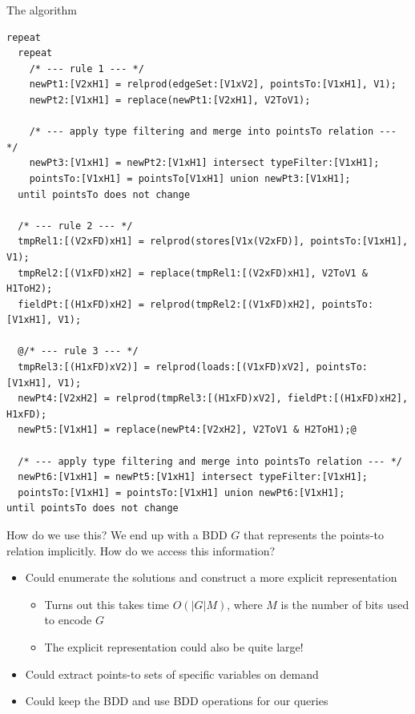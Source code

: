 \documentclass{beamer}
\begin{document}
\begin{frame}[fragile]{The algorithm}
\begin{lstlisting}[style=base]
repeat
  repeat
    /* --- rule 1 --- */
    newPt1:[V2xH1] = relprod(edgeSet:[V1xV2], pointsTo:[V1xH1], V1);
    newPt2:[V1xH1] = replace(newPt1:[V2xH1], V2ToV1);

    /* --- apply type filtering and merge into pointsTo relation --- */
    newPt3:[V1xH1] = newPt2:[V1xH1] intersect typeFilter:[V1xH1];
    pointsTo:[V1xH1] = pointsTo[V1xH1] union newPt3:[V1xH1];
  until pointsTo does not change

  /* --- rule 2 --- */
  tmpRel1:[(V2xFD)xH1] = relprod(stores[V1x(V2xFD)], pointsTo:[V1xH1], V1);
  tmpRel2:[(V1xFD)xH2] = replace(tmpRel1:[(V2xFD)xH1], V2ToV1 & H1ToH2);
  fieldPt:[(H1xFD)xH2] = relprod(tmpRel2:[(V1xFD)xH2], pointsTo:[V1xH1], V1);

  @/* --- rule 3 --- */
  tmpRel3:[(H1xFD)xV2)] = relprod(loads:[(V1xFD)xV2], pointsTo:[V1xH1], V1);
  newPt4:[V2xH2] = relprod(tmpRel3:[(H1xFD)xV2], fieldPt:[(H1xFD)xH2], H1xFD);
  newPt5:[V1xH1] = replace(newPt4:[V2xH2], V2ToV1 & H2ToH1);@

  /* --- apply type filtering and merge into pointsTo relation --- */
  newPt6:[V1xH1] = newPt5:[V1xH1] intersect typeFilter:[V1xH1];
  pointsTo:[V1xH1] = pointsTo:[V1xH1] union newPt6:[V1xH1];
until pointsTo does not change
\end{lstlisting}
\end{frame} 

\begin{frame}{How do we use this?}
We end up with a BDD $G$ that represents the points-to relation implicitly. How do we access this information?
\begin{itemize}
\item Could enumerate the solutions and construct a more explicit
representation
  \begin{itemize}
    \item Turns out this takes time $O(|G|M)$, where $M$ is the number of
    bits used to encode $G$
    \item The explicit representation could also be quite large!
  \end{itemize}
\item Could extract points-to sets of specific variables on demand
\item Could keep the BDD and use BDD operations for our queries
\end{itemize}
\end{frame}
\end{document}
